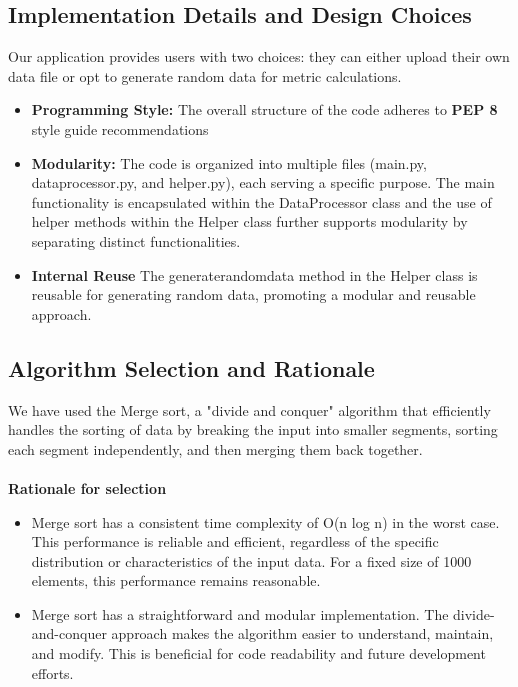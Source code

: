\documentclass[runningheads]{llncs}
\begin{document}
\subsection{Implementation Details and Design Choices}
 Our application provides users with two choices: they can either upload their own data file or opt to generate random data for metric calculations.
\begin{itemize}
\item \textbf{Programming Style:} The overall structure of the code adheres to \textbf{PEP 8} style guide recommendations
\item\textbf{Modularity:} The code is organized into multiple files (main.py, data\textunderscore processor.py, and helper.py), each serving a specific purpose. The main functionality is encapsulated within the DataProcessor class and the use of helper methods within the Helper class  further supports modularity by separating distinct functionalities.
\item \textbf{Internal Reuse} The generate\textunderscore random\textunderscore data method in the Helper class is reusable for generating random data, promoting a modular and reusable approach.
\end{itemize}

\subsection{Algorithm Selection and Rationale}
We have used the Merge sort, a "divide and conquer" algorithm that efficiently handles the sorting of data by breaking the input into smaller segments, sorting each segment independently, and then merging them back together.\\
\\
\textbf{Rationale for selection}\\
\begin{itemize}
\item Merge sort has a consistent time complexity of O(n log n) in the worst case. This performance is reliable and efficient, regardless of the specific distribution or characteristics of the input data. For a fixed size of 1000 elements, this performance remains reasonable.
\item Merge sort has a straightforward and modular implementation. The divide-and-conquer approach makes the algorithm easier to understand, maintain, and modify. This is beneficial for code readability and future development efforts.
\end{itemize}
\end{document}
